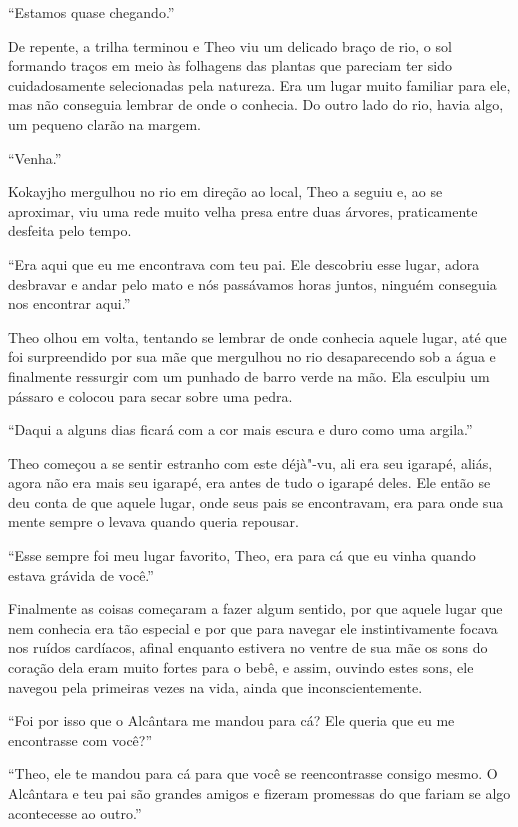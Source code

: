 ``Estamos quase chegando.''

De repente, a trilha terminou e Theo viu um delicado braço de rio, o sol
formando traços em meio às folhagens das plantas que pareciam ter sido
cuidadosamente selecionadas pela natureza. Era um lugar muito familiar
para ele, mas não conseguia lembrar de onde o conhecia. Do outro lado do
rio, havia algo, um pequeno clarão na margem.

``Venha.''

Kokayjho mergulhou no rio em direção ao local, Theo a seguiu e, ao se
aproximar, viu uma rede muito velha presa entre duas árvores,
praticamente desfeita pelo tempo.

``Era aqui que eu me encontrava com teu pai. Ele descobriu esse lugar,
adora desbravar e andar pelo mato e nós passávamos horas juntos, ninguém
conseguia nos encontrar aqui.''

Theo olhou em volta, tentando se lembrar de onde conhecia aquele lugar,
até que foi surpreendido por sua mãe que mergulhou no rio desaparecendo
sob a água e finalmente ressurgir com um punhado de barro verde na mão.
Ela esculpiu um pássaro e colocou para secar sobre uma pedra.

``Daqui a alguns dias ficará com a cor mais escura e duro como uma
argila.''

Theo começou a se sentir estranho com este déjà"-vu, ali era seu igarapé,
aliás, agora não era mais seu igarapé, era antes de tudo o igarapé
deles. Ele então se deu conta de que aquele lugar, onde seus pais se
encontravam, era para onde sua mente sempre o levava quando queria
repousar.

``Esse sempre foi meu lugar favorito, Theo, era para cá que eu vinha
quando estava grávida de você.''

Finalmente as coisas começaram a fazer algum sentido, por que aquele
lugar que nem conhecia era tão especial e por que para navegar ele
instintivamente focava nos ruídos cardíacos, afinal enquanto estivera no
ventre de sua mãe os sons do coração dela eram muito fortes para o bebê,
e assim, ouvindo estes sons, ele navegou pela primeiras vezes na vida,
ainda que inconscientemente.

``Foi por isso que o Alcântara me mandou para cá? Ele queria que eu me
encontrasse com você?''

``Theo, ele te mandou para cá para que você se reencontrasse consigo
mesmo. O Alcântara e teu pai são grandes amigos e fizeram promessas do
que fariam se algo acontecesse ao outro.''


